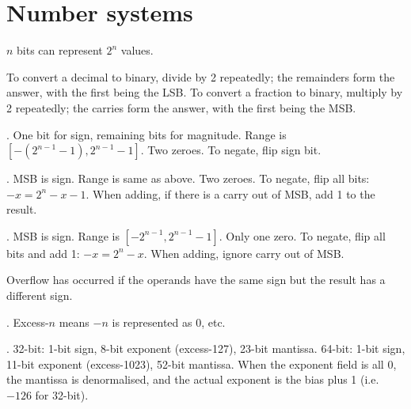 \documentclass{slnotes}
\begin{document}
\chapter{Number systems}
\(n\) bits can represent \(2^n\) values.

To convert a decimal to binary, divide by 2 repeatedly; the remainders form the answer, with the first being the LSB. To convert a fraction to binary, multiply by 2 repeatedly; the carries form the answer, with the first being the MSB.

. One bit for sign, remaining bits for magnitude. Range is \([-(2^{n-1}-1), 2^{n-1}-1]\). Two zeroes. To negate, flip sign bit.

. MSB is sign. Range is same as above. Two zeroes. To negate, flip all bits: \(-x = 2^n - x - 1\). When adding, if there is a carry out of MSB, add 1 to the result.

. MSB is sign. Range is \([-2^{n-1}, 2^{n-1}-1]\). Only one zero. To negate, flip all bits and add 1: \(-x = 2^n - x\). When adding, ignore carry out of MSB.

Overflow has occurred if the operands have the same sign but the result has a different sign.

. Excess-\(n\) means \(-n\) is represented as 0, etc.

. 32-bit: 1-bit sign, 8-bit exponent (excess-127), 23-bit mantissa. 64-bit: 1-bit sign, 11-bit exponent (excess-1023), 52-bit mantissa. When the exponent field is all 0, the mantissa is denormalised, and the actual exponent is the bias plus 1 (i.e. \(-126\) for 32-bit).
\end{document}
